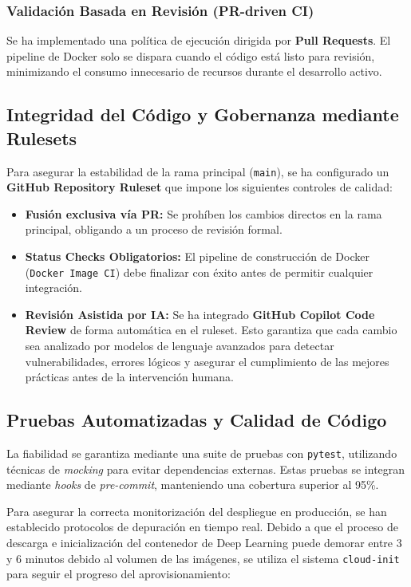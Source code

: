 \subsubsection{Validación Basada en Revisión (PR-driven CI)}
Se ha implementado una política de ejecución dirigida por \textbf{Pull Requests}. El pipeline de Docker solo se dispara cuando el código está listo para revisión, minimizando el consumo innecesario de recursos durante el desarrollo activo.

\subsection{Integridad del Código y Gobernanza mediante Rulesets}
Para asegurar la estabilidad de la rama principal (\texttt{main}), se ha configurado un \textbf{GitHub Repository Ruleset} que impone los siguientes controles de calidad:
\begin{itemize}
    \item \textbf{Fusión exclusiva vía PR:} Se prohíben los cambios directos en la rama principal, obligando a un proceso de revisión formal.
    \item \textbf{Status Checks Obligatorios:} El pipeline de construcción de Docker (\texttt{Docker Image CI}) debe finalizar con éxito antes de permitir cualquier integración.
    \item \textbf{Revisión Asistida por IA:} Se ha integrado \textbf{GitHub Copilot Code Review} de forma automática en el ruleset. Esto garantiza que cada cambio sea analizado por modelos de lenguaje avanzados para detectar vulnerabilidades, errores lógicos y asegurar el cumplimiento de las mejores prácticas antes de la intervención humana.
\end{itemize}

\subsection{Pruebas Automatizadas y Calidad de Código}
La fiabilidad se garantiza mediante una suite de pruebas con \texttt{pytest}, utilizando técnicas de \textit{mocking} para evitar dependencias externas. Estas pruebas se integran mediante \textit{hooks} de \textit{pre-commit}, manteniendo una cobertura superior al 95\%.

Para asegurar la correcta monitorización del despliegue en producción, se han establecido protocolos de depuración en tiempo real. Debido a que el proceso de descarga e inicialización del contenedor de Deep Learning puede demorar entre 3 y 6 minutos debido al volumen de las imágenes, se utiliza el sistema \texttt{cloud-init} para seguir el progreso del aprovisionamiento:

